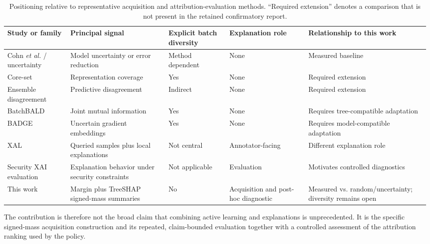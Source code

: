 \begin{table}[t]
\centering
\caption{Positioning relative to representative acquisition and attribution-evaluation methods. ``Required extension'' denotes a comparison that is not present in the retained confirmatory report.}
\label{tab:related}
\scriptsize
\setlength{\tabcolsep}{3pt}
\begin{tabular}{p{3.0cm}p{3.6cm}p{2.5cm}p{2.6cm}p{3.4cm}}
\toprule
Study or family & Principal signal & Explicit batch diversity & Explanation role & Relationship to this work \\
\midrule
Cohn \emph{et al.} \cite{cohn1996active} / uncertainty & Model uncertainty or error reduction & Method dependent & None & Measured baseline \\
Core-set \cite{sener2018active} & Representation coverage & Yes & None & Required extension \\
Ensemble disagreement \cite{beluch2018power} & Predictive disagreement & Indirect & None & Required extension \\
BatchBALD \cite{kirsch2019batchbald} & Joint mutual information & Yes & None & Requires tree-compatible adaptation \\
BADGE \cite{ash2020deep} & Uncertain gradient embeddings & Yes & None & Requires model-compatible adaptation \\
XAL \cite{ghai2021explainable} & Queried samples plus local explanations & Not central & Annotator-facing & Different explanation role \\
Security XAI evaluation \cite{warnecke2020evaluating} & Explanation behavior under security constraints & Not applicable & Evaluation & Motivates controlled diagnostics \\
This work & Margin plus TreeSHAP signed-mass summaries & No & Acquisition and post-hoc diagnostic & Measured vs. random/uncertainty; diversity remains open \\
\bottomrule
\end{tabular}
\end{table}

The contribution is therefore not the broad claim that combining active learning
and explanations is unprecedented. It is the specific signed-mass acquisition
construction and its repeated, claim-bounded evaluation together with a
controlled assessment of the attribution ranking used by the policy.

